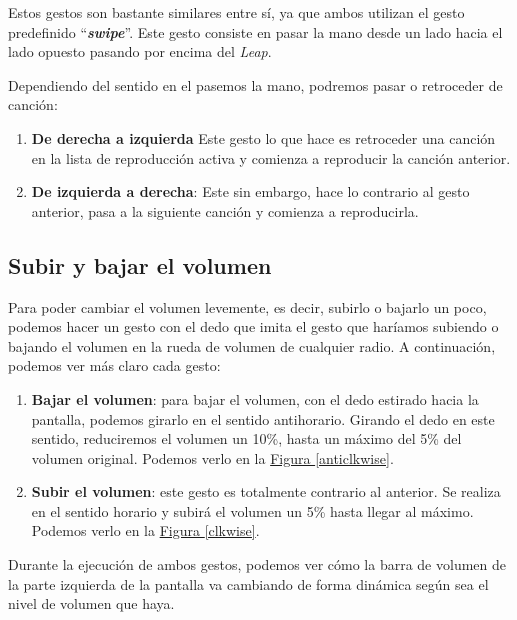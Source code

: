 \documentclass[10pt,a4paper,spanish]{article}
\begin{document}
Estos gestos son bastante similares entre sí, ya que ambos utilizan el gesto predefinido ``\textbf{\textit{\textcolor{verde}{swipe}}}''. Este gesto consiste en pasar la mano desde un lado hacia el lado opuesto pasando por encima del \textit{\textcolor{verde}{Leap}}.

Dependiendo del sentido en el pasemos la mano, podremos pasar o retroceder de canción:

\begin{enumerate}[$\bullet$]
  \item \textbf{\textcolor{verde}{De derecha a izquierda}} Este gesto lo que hace es retroceder una canción en la lista de reproducción activa y comienza a reproducir la canción anterior.
  \item \textbf{\textcolor{verde}{De izquierda a derecha}}: Este sin embargo, hace lo contrario al gesto anterior, pasa a la siguiente canción y comienza a reproducirla.
\end{enumerate}


\subsection{\textcolor{verde}Subir y bajar el volumen}

Para poder cambiar el volumen levemente, es decir, subirlo o bajarlo un poco, podemos hacer un gesto con el dedo que imita el gesto que haríamos subiendo o bajando el volumen en la rueda de volumen de cualquier radio. A continuación, podemos ver más claro cada gesto:

\begin{enumerate}[$\bullet$]
  \item \textbf{\textcolor{verde}{Bajar el volumen}}: para bajar el volumen, con el dedo estirado hacia la pantalla, podemos girarlo en el sentido antihorario. Girando el dedo en este sentido, reduciremos el volumen un 10\%, hasta un máximo del 5\% del volumen original. Podemos verlo en la \hyperref[anticlkwise]{Figura \ref*{anticlkwise}}.
  \item \textbf{\textcolor{verde}{Subir el volumen}}: este gesto es totalmente contrario al anterior. Se realiza en el sentido horario y subirá el volumen un 5\% hasta llegar al máximo. Podemos verlo en la \hyperref[clkwise]{Figura \ref*{clkwise}}.
\end{enumerate}

Durante la ejecución de ambos gestos, podemos ver cómo la barra de volumen de la parte izquierda de la pantalla va cambiando de forma dinámica según sea el nivel de volumen que haya.
\end{document}
